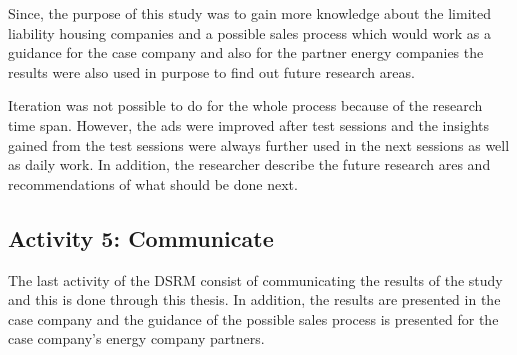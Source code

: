 Since, the purpose of this study was to gain more knowledge about the limited liability housing companies and a possible sales process which would work as a guidance for the case company and also for the partner energy companies the results were also used in purpose to find out future research areas.

Iteration was not possible to do for the whole process because of the research time span. However, the ads were improved after test sessions and the insights gained from the test sessions were always further used in the next sessions as well as daily work. In addition, the researcher describe the future research ares and recommendations of what should be done next.

\subsection{Activity 5: Communicate}

The last activity of the DSRM consist of communicating the results of the study and this is done through this thesis. In addition, the results are presented in the case company and the guidance of the possible sales process is presented for the case company's energy company partners.






 